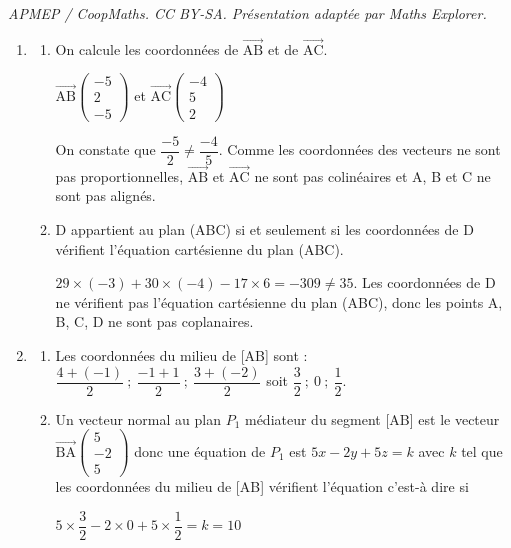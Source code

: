 \documentclass[10pt]{article}
\providecommand{\vect}[1]{\overrightarrow{#1}}
\begin{document}
\noindent\textit{APMEP / CoopMaths. CC BY-SA. Présentation adaptée par Maths Explorer.}\par\medskip
\begin{enumerate}
	\item 
	\begin{enumerate}
		\item On calcule les coordonnées de $\vect{\text{AB}}$ et de $\vect{\text{AC}}$.
		
		$\vect{\text{AB}}\left(
		\begin{array}{c}
		-5\\
		2\\
		-5
		\end{array}
		\right)$
et
		$\vect{\text{AC}}\left(
		\begin{array}{c}
		-4\\
		5\\
		2
		\end{array}
		\right)$
		
		On constate que $\dfrac{-5}{2}\neq \dfrac{-4}{5}$. Comme les coordonnées des vecteurs ne sont pas proportionnelles, 	$\vect{\text{AB}}$ et $\vect{\text{AC}}$ ne sont pas colinéaires et A, B et C ne sont pas alignés.
		\item
D appartient au plan (ABC) si et seulement si les coordonnées de D vérifient l'équation cartésienne du plan (ABC).

$ 29\times (-3) + 30 \times (-4) - 17 \times 6 = -309 \neq 35$. Les coordonnées de D ne vérifient pas  l'équation cartésienne du plan (ABC), donc les points A, B, C, D ne sont pas coplanaires.
	\end{enumerate}
	\item 
	\begin{enumerate}
		\item Les coordonnées du milieu de [AB] sont :
$\dfrac{4+(-1)}{2}~;~\dfrac{-1+1}{2}~;~\dfrac{3+(-2)}{2}$ soit $\dfrac32~;~0~;~\dfrac12$.
	
		\item Un vecteur normal au plan $P_1$ médiateur du segment [AB] est le vecteur $\vect{\text{BA}}\left(
		\begin{array}{c}
		5\\
		-2\\
		5
		\end{array}
		\right)$ donc une équation de $P_1$ est $5x - 2y + 5z = k$ avec $k$ tel que les coordonnées du milieu de [AB] vérifient l'équation c'est-à dire si 

$5\times\dfrac{3}{2} - 2\times 0 + 5\times\dfrac{1}{2} =  k =10$


\end{enumerate}
\end{enumerate}
\end{document}
